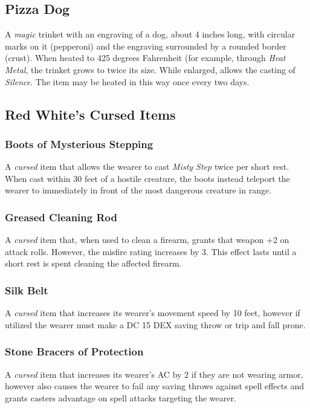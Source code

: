 \subsection{Pizza Dog}
\label{items:pizzadog}
A \textit{magic} trinket with an engraving of a dog, about 4 inches long, with circular marks on it (pepperoni) and the 	engraving surrounded by a rounded border (crust). When heated to 425 degrees Fahrenheit (for example, through \textit{Heat Metal}, the trinket grows to twice its size. While enlarged, allows the casting of \textit{Silence}. The item may be heated in this way once every two days.

\subsection{Red White's Cursed Items}

\subsubsection{Boots of Mysterious Stepping}
\label{items:boots}
A \textit{cursed} item that allows the wearer to cast \textit{Misty Step} twice per short rest. When cast within 30 feet of a hostile creature, the boots instead teleport the wearer to immediately in front of the most dangerous creature in range.

\subsubsection{Greased Cleaning Rod}
\label{items:rod}
A \textit{cursed} item that, when used to clean a firearm, grants that weapon +2 on attack rolls. However, the misfire rating increases by 3. This effect lasts until a short rest is spent cleaning the affected firearm.

\subsubsection{Silk Belt}
\label{items:silkbelt}
A \textit{cursed} item that increases its wearer's movement speed by 10 feet, however if utilized the wearer must make a DC 15 DEX saving throw or trip and fall prone.

\subsubsection{Stone Bracers of Protection}
\label{items:bracers}
A \textit{cursed} item that increases its wearer's AC by 2 if they are not wearing armor, however also causes the wearer to fail any saving throws against spell effects and grants casters advantage on spell attacks targeting the wearer.

